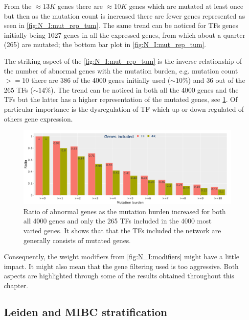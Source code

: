 From the $\approx13K$ genes there are $\approx10K$ genes which are mutated at least once but then as the mutation count is increased there are fewer genes represented as seen in \cref{fig:N_I:mut_rep_tum}. The same trend can be noticed for TFs genes initially being 1027 genes in all the expressed genes, from which about a quarter (265) are mutated; the bottom bar plot in \cref{fig:N_I:mut_rep_tum}.

The striking aspect of the \cref{fig:N_I:mut_rep_tum} is the inverse relationship of the number of abnormal genes with the mutation burden, e.g. mutation count $>=10$ there are 386 of the 4000 genes initially used ($\sim10\%$) and 36 out of the 265 TFs ($\sim14\%$). The trend can be noticed in both all the 4000 genes and the TFs but the latter has a higher representation of the mutated genes, see \cref{fig:N_I:prct_mut_rep_tum}. Of particular importance is the dysregulation of TF which up or down regulated of others gene expression.

\begin{figure}[!htb]    
    \centering
    \includegraphics[width=1.0\textwidth,keepaspectratio]{Sections/Network_I/Resources/Tum_network/MutTF_representation_4K_TF_prct.png}
    \caption{Ratio of abnormal genes as the mutation burden increased for both all 4000 genes and only the 265 TFs included in the 4000 most varied genes. It shows that that the TFs included the network are generally consists of mutated genes.}
    \label{fig:N_I:prct_mut_rep_tum}
\end{figure}

Consequently, the weight modifiers from  \cref{fig:N_I:modifiers} might have a little impact. It might also mean that the gene filtering used is too aggressive. Both aspects are highlighted through some of the results obtained throughout this chapter.

\subsection{Leiden and MIBC stratification} \label{s:N_I:tum_stratification}

